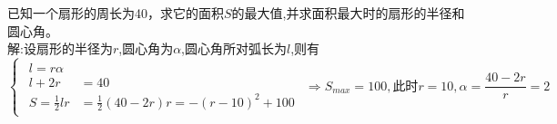 \documentclass[12pt,answers]{exam}
\begin{document}
\begin{questions}
\question 
已知一个扇形的周长为40，求它的面积$S$的最大值,并求面积最大时的扇形的半径和圆心角。\\
解:设扇形的半径为$r$,圆心角为$\alpha$,圆心角所对弧长为$l$,则有
\begin{equation*}
\begin{cases}
\begin{split}
l=r\alpha\\
l+2r&=40  \\
S=\frac{1}{2}lr&=\frac{1}{2}(40-2r)r= -(r-10)^2+100
\end{split}
\end{cases}
\Rightarrow S_{max}=100,\text{此时} r=10,\alpha = \frac{40-2r}{r}=2
\end{equation*}
\end{questions}
\end{document}
